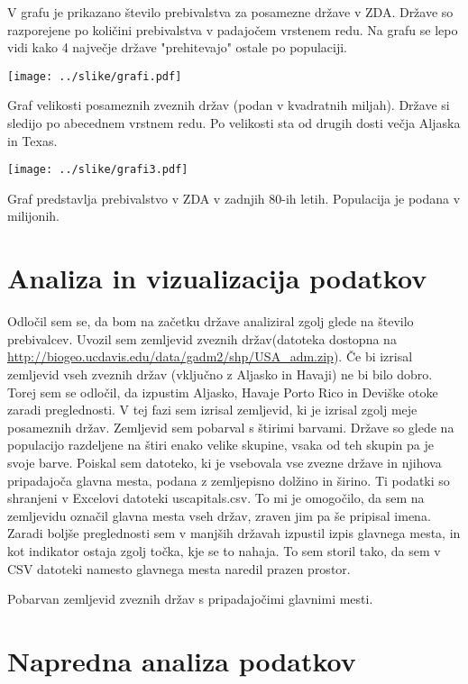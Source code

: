 \documentclass[11pt,a4paper]{article}
\begin{document}
V grafu je prikazano število prebivalstva za posamezne države v ZDA. Države so razporejene po količini prebivalstva v padajočem vrstenem redu. Na grafu se lepo vidi kako 4 največje države "prehitevajo" ostale po populaciji.

\texttt{[image: ../slike/grafi.pdf]}

Graf velikosti posameznih zveznih držav (podan v kvadratnih miljah). Države si sledijo po abecednem vrstnem redu. Po velikosti sta od drugih dosti večja Aljaska in Texas.

\texttt{[image: ../slike/grafi3.pdf]}

Graf predstavlja prebivalstvo v ZDA v zadnjih 80-ih letih. Populacija je podana v milijonih.

\pagebreak

\section{Analiza in vizualizacija podatkov}

Odločil sem se, da bom na začetku države analiziral zgolj glede na število prebivalcev. Uvozil sem zemljevid zveznih držav(datoteka dostopna na \url{http://biogeo.ucdavis.edu/data/gadm2/shp/USA_adm.zip}). Če bi izrisal zemljevid vseh zveznih držav (vključno z Aljasko in Havaji) ne bi bilo dobro. Torej sem se odločil, da izpustim Aljasko, Havaje Porto Rico in Deviške otoke zaradi
preglednosti. V tej fazi sem izrisal zemljevid, ki je izrisal zgolj meje posameznih držav.
Zemljevid sem pobarval s štirimi barvami. Države so glede na populacijo razdeljene na štiri enako velike skupine, vsaka od teh skupin pa je svoje barve.
Poiskal sem datoteko, ki je vsebovala vse zvezne države in njihova pripadajoča glavna mesta, podana z zemljepisno dolžino in širino. Ti podatki so shranjeni v Excelovi datoteki uscapitals.csv. To mi je omogočilo, da sem na zemljevidu označil glavna mesta vseh držav, zraven jim pa še pripisal imena. Zaradi boljše preglednosti sem v manjših državah izpustil izpis glavnega mesta, in kot indikator ostaja zgolj točka, kje se to nahaja. To sem storil tako, da sem v CSV datoteki namesto glavnega mesta naredil prazen prostor.

Pobarvan zemljevid zveznih držav s pripadajočimi glavnimi mesti.

\newpage
\section{Napredna analiza podatkov}
\end{document}
